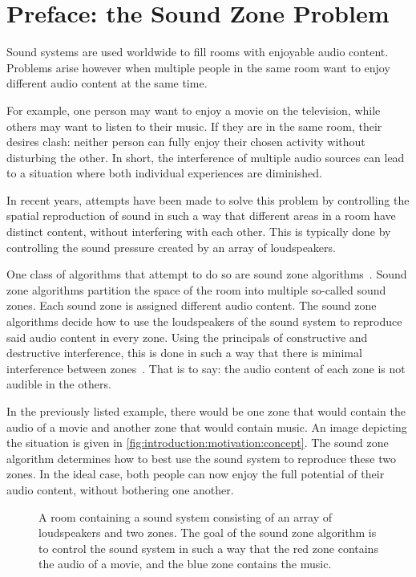 \section{Preface: the Sound Zone Problem}
\label{ch:introduction:preface}
Sound systems are used worldwide to fill rooms with enjoyable audio content. 
Problems arise however when multiple people in the same room want to enjoy different audio content at the same time.

For example, one person may want to enjoy a movie on the television, while others may want to listen to their music.
If they are in the same room, their desires clash: neither person can fully enjoy their chosen activity without disturbing
the other.
In short, the interference of multiple audio sources can lead to a situation where both individual experiences are diminished.

In recent years, attempts have been made to solve this problem by controlling the spatial reproduction of sound in such
a way that different areas in a room have distinct content, without interfering with each other.
This is typically done by controlling the sound pressure created by an array of loudspeakers.

One class of algorithms that attempt to do so are sound zone algorithms~\cite{betlehem2015personal}.
Sound zone algorithms partition the space of the room into multiple so-called sound zones.
Each sound zone is assigned different audio content.
The sound zone algorithms decide how to use the loudspeakers of the sound system to reproduce said audio content in every zone.
Using the principals of constructive and destructive interference, this is done in such a way that there is 
minimal interference between zones~\cite{betlehem2015personal}.
That is to say: the audio content of each zone is not audible in the others.

In the previously listed example, there would be one zone that would contain the audio of a movie and another zone that would contain music.
An image depicting the situation is given in \autoref{fig:introduction:motivation:concept}.
The sound zone algorithm determines how to best use the sound system to reproduce these two zones.
In the ideal case, both people can now enjoy the full potential of their audio content, without bothering one another.

\begin{figure}[]
    \centering
    \scalebox{1.0}{}
    \caption{A room containing a sound system consisting of an array of loudspeakers and two zones.
                The goal of the sound zone algorithm is to control the sound system in such a way that the red zone
                contains the audio of a movie, and the blue zone contains the music.}
    \label{fig:introduction:motivation:concept}
\end{figure}

